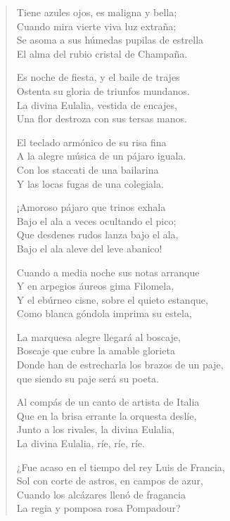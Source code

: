 \documentclass[12pt]{article}
\begin{document}
\begin{verse}
Tiene azules ojos, es maligna y bella;\\
Cuando mira vierte viva luz extraña;\\
Se asoma a sus húmedas pupilas de estrella\\
El alma del rubio cristal de Champaña.  

Es noche de fiesta, y el baile de trajes\\
Ostenta su gloria de triunfos mundanos.\\
La divina Eulalia, vestida de encajes,\\
Una flor destroza con sus tersas manos.  

El teclado armónico de su risa fina\\
A la alegre música de un pájaro iguala.\\
Con los staccati de una bailarina\\
Y las locas fugas de una colegiala.  

¡Amoroso pájaro que trinos exhala\\
Bajo el ala a veces ocultando el pico;\\
Que desdenes rudos lanza bajo el ala,\\
Bajo el ala aleve del leve abanico!  

Cuando a media noche sus notas arranque\\
Y en arpegios áureos gima Filomela,\\
Y el ebúrneo cisne, sobre el quieto estanque,\\
Como blanca góndola imprima su estela,  

La marquesa alegre llegará al boscaje,\\
Boscaje que cubre la amable glorieta\\
Donde han de estrecharla los brazos de un paje,\\
que siendo su paje será su poeta.  

Al compás de un canto de artista de Italia\\
Que en la brisa errante la orquesta deslíe,\\
Junto a los rivales, la divina Eulalia,\\
La divina Eulalia, ríe, ríe, ríe.  

¿Fue acaso en el tiempo del rey Luis de Francia,\\
Sol con corte de astros, en campos de azur,\\
Cuando los alcázares llenó de fragancia\\
La regia y pomposa rosa Pompadour?  


\end{verse}
\end{document}
